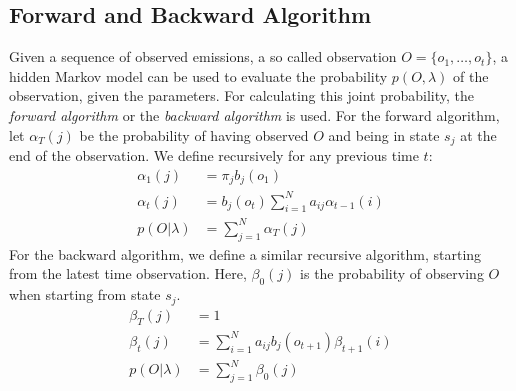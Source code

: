 \begin{minipage}{\linewidth}
	\label{fig:hmm}
	\hspace{1cm}
\end{minipage}

\subsection{Forward and Backward Algorithm}
Given a sequence of observed emissions, a so called observation $O = \{o_1, \dots, o_t\}$, a hidden Markov model can be used to evaluate the probability $p(O, \lambda)$ of the observation, given the parameters. For calculating this joint probability, the \textit{forward algorithm} or the \textit{backward algorithm} is used. For the forward algorithm, let $\alpha_T(j)$ be the probability of having observed $O$ and being in state $s_j$ at the end of the observation. We define recursively for any previous time $t$:
\begin{align*}
\alpha_1(j) &= \pi_j b_j(o_1) \\
\alpha_t(j) &= b_j(o_t) \sum_{i = 1}^{N} a_{ij}\alpha_{t-1}(i) \\
p(O|\lambda) &= \sum_{j = 1}^{N} \alpha_T(j)
\end{align*}
For the backward algorithm, we define a similar recursive algorithm, starting from the latest time observation. Here, $\beta_0(j)$ is the probability of observing $O$ when starting from state $s_j$.
\begin{align*}
\beta_T(j) &= 1 \\
\beta_t(j) &= \sum_{i = 1}^{N} a_{ij}b_j(o_{t+1}) \beta_{t+1}(i) \\
p(O|\lambda) &= \sum_{j = 1}^{N} \beta_0(j)
\end{align*}
